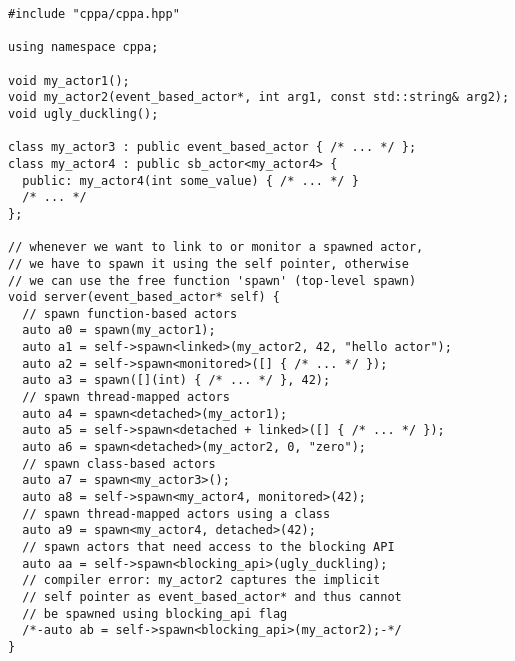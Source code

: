 \begin{lstlisting}
#include "cppa/cppa.hpp"

using namespace cppa;

void my_actor1();
void my_actor2(event_based_actor*, int arg1, const std::string& arg2);
void ugly_duckling();

class my_actor3 : public event_based_actor { /* ... */ };
class my_actor4 : public sb_actor<my_actor4> {
  public: my_actor4(int some_value) { /* ... */ }
  /* ... */
};

// whenever we want to link to or monitor a spawned actor,
// we have to spawn it using the self pointer, otherwise
// we can use the free function 'spawn' (top-level spawn)
void server(event_based_actor* self) {
  // spawn function-based actors
  auto a0 = spawn(my_actor1);
  auto a1 = self->spawn<linked>(my_actor2, 42, "hello actor");
  auto a2 = self->spawn<monitored>([] { /* ... */ });
  auto a3 = spawn([](int) { /* ... */ }, 42);
  // spawn thread-mapped actors
  auto a4 = spawn<detached>(my_actor1);
  auto a5 = self->spawn<detached + linked>([] { /* ... */ });
  auto a6 = spawn<detached>(my_actor2, 0, "zero");
  // spawn class-based actors
  auto a7 = spawn<my_actor3>();
  auto a8 = self->spawn<my_actor4, monitored>(42);
  // spawn thread-mapped actors using a class
  auto a9 = spawn<my_actor4, detached>(42);
  // spawn actors that need access to the blocking API
  auto aa = self->spawn<blocking_api>(ugly_duckling);
  // compiler error: my_actor2 captures the implicit
  // self pointer as event_based_actor* and thus cannot
  // be spawned using blocking_api flag
  /*-auto ab = self->spawn<blocking_api>(my_actor2);-*/
}
\end{lstlisting}

